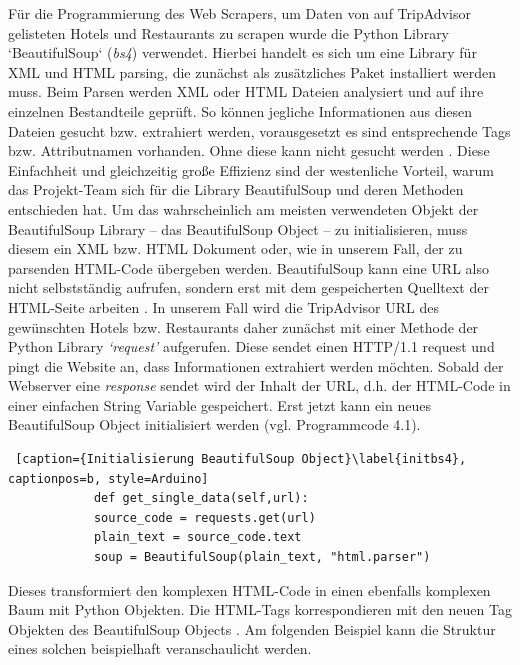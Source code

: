 \documentclass[a4paper,oneside,12pt]{report}
\begin{document}
			Für die Programmierung des Web Scrapers, um Daten von auf TripAdvisor gelisteten Hotels und Restaurants zu scrapen wurde die Python Library ‘BeautifulSoup‘ (\textit{bs4}) verwendet.
			\newline
			Hierbei handelt es sich um eine Library für XML und HTML parsing, die zunächst als zusätzliches Paket installiert werden muss. Beim Parsen werden XML oder HTML Dateien analysiert und auf ihre einzelnen Bestandteile geprüft. So können jegliche Informationen aus diesen Dateien gesucht bzw. extrahiert werden, vorausgesetzt es sind entsprechende Tags bzw. Attributnamen vorhanden. Ohne diese kann nicht gesucht werden \cite{bib-webpython}. Diese Einfachheit und gleichzeitig große Effizienz sind der westenliche Vorteil, warum das Projekt-Team sich für die Library BeautifulSoup und deren Methoden entschieden hat.
			\newline
			Um das wahrscheinlich am meisten verwendeten Objekt der BeautifulSoup Library – das BeautifulSoup Object – zu initialisieren, muss diesem ein XML bzw. HTML Dokument oder, wie in unserem Fall, der zu parsenden HTML-Code übergeben werden. BeautifulSoup kann eine URL also nicht selbstständig aufrufen, sondern erst mit dem gespeicherten Quelltext der HTML-Seite arbeiten \cite{bib-bs4}. In unserem Fall wird die TripAdvisor URL des gewünschten Hotels bzw. Restaurants daher zunächst mit einer Methode der Python Library \textit{‘request'} aufgerufen. Diese sendet einen HTTP/1.1 request und pingt die Website an, dass Informationen extrahiert werden möchten. Sobald der Webserver eine \textit{response} sendet wird der Inhalt der URL, d.h. der HTML-Code in einer einfachen String Variable gespeichert. Erst jetzt kann ein neues BeautifulSoup Object initialisiert werden (vgl. Programmcode 4.1).
			\begin{lstlisting} [caption={Initialisierung BeautifulSoup Object}\label{initbs4}, captionpos=b, style=Arduino]
			def get_single_data(self,url):
			source_code = requests.get(url)
			plain_text = source_code.text
			soup = BeautifulSoup(plain_text, "html.parser")
			\end{lstlisting}
			
			Dieses transformiert den komplexen HTML-Code in einen ebenfalls komplexen Baum mit Python Objekten. Die HTML-Tags korrespondieren mit den neuen Tag Objekten des BeautifulSoup Objects \cite{bib-bs4}. Am folgenden Beispiel kann die Struktur eines solchen beispielhaft veranschaulicht werden.
			
\end{document}
